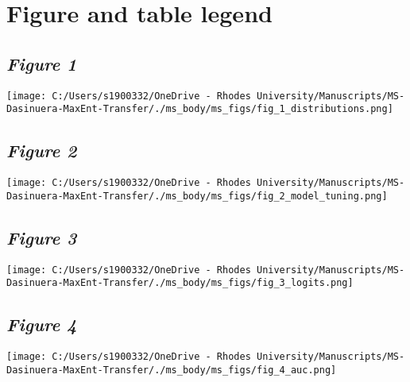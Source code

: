 \documentclass[12pt,]{article}
\begin{document}
\newpage

\hypertarget{figure-and-table-legend}{%
\section{Figure and table legend}\label{figure-and-table-legend}}

\setlength{\parindent}{-0.2in}
\setlength{\leftskip}{0.2in}
\setlength{\parskip}{8pt}
\vspace*{-0.2in}

\noindent

\newpage

\hypertarget{figure-1}{%
\subsection{\texorpdfstring{\emph{Figure 1}}{Figure 1}}\label{figure-1}}

\texttt{[image: C:/Users/s1900332/OneDrive - Rhodes University/Manuscripts/MS-Dasinuera-MaxEnt-Transfer/./ms\_body/ms\_figs/fig\_1\_distributions.png]}

\newpage

\hypertarget{figure-2}{%
\subsection{\texorpdfstring{\emph{Figure 2}}{Figure 2}}\label{figure-2}}

\texttt{[image: C:/Users/s1900332/OneDrive - Rhodes University/Manuscripts/MS-Dasinuera-MaxEnt-Transfer/./ms\_body/ms\_figs/fig\_2\_model\_tuning.png]}

\newpage

\hypertarget{figure-3}{%
\subsection{\texorpdfstring{\emph{Figure 3}}{Figure 3}}\label{figure-3}}

\texttt{[image: C:/Users/s1900332/OneDrive - Rhodes University/Manuscripts/MS-Dasinuera-MaxEnt-Transfer/./ms\_body/ms\_figs/fig\_3\_logits.png]}

\newpage

\hypertarget{figure-4}{%
\subsection{\texorpdfstring{\emph{Figure 4}}{Figure 4}}\label{figure-4}}

\texttt{[image: C:/Users/s1900332/OneDrive - Rhodes University/Manuscripts/MS-Dasinuera-MaxEnt-Transfer/./ms\_body/ms\_figs/fig\_4\_auc.png]}
\end{document}
